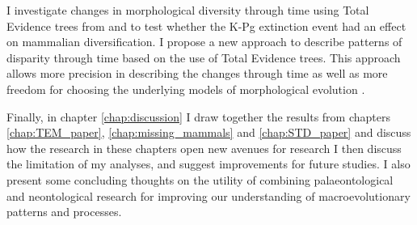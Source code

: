 I investigate changes in morphological diversity \citep[or disparity;][]{Wills1994} through time using Total Evidence trees from \cite{slaterphylogenetic2013} and \cite{beckancient2014} to test whether the K-Pg extinction event had an effect on mammalian diversification.
I propose a new approach to describe patterns of disparity through time based on the use of Total Evidence trees.
This approach allows more precision in describing the changes through time as well as more freedom for choosing the underlying models of morphological evolution \citep[e.g. punctuated or gradual;][]{Hunt21042015}.



Finally, in chapter \ref{chap:discussion} I draw together the results from chapters \ref{chap:TEM_paper}, \ref{chap:missing_mammals} and \ref{chap:STD_paper} and discuss how the research in these chapters open new avenues for research %
I then discuss the limitation of my analyses, and suggest improvements for future studies.
I also present some concluding thoughts on the utility of combining palaeontological and neontological research for improving our understanding of macroevolutionary patterns and processes.

%